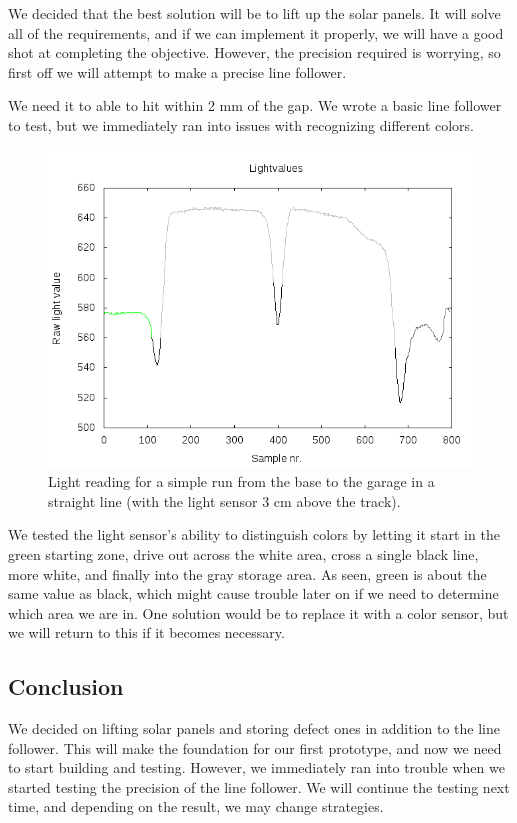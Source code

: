 We decided that the best solution will be to lift up the solar panels.
It will solve all of the requirements, and if we can implement it
properly, we will have a good shot at completing the objective. However,
the precision required is worrying, so first off we will attempt to
make a precise line follower.

We need it to able to hit within 2 mm of
the gap. We wrote a basic line follower to test, but we immediately ran
into issues with recognizing different colors.

\begin{figure}[h]
  \centering
  \includegraphics[scale=0.43]{../experiments/1prototype/results/gnuplot/GridAccuracy3cm_color.png}
  \caption{Light reading for a simple run from the base to the garage in a straight line (with the light sensor 3 cm above the track).}
\end{figure}


We tested the light sensor's ability to distinguish colors by letting it
start in the green starting zone, drive out across the white area,
cross a single black line, more white, and finally into the gray
storage area. As seen, green is about the same value as black, which
might cause trouble later on if we need to determine which area we are
in. One solution would be to replace it with a color sensor, but we will
return to this if it becomes necessary.

\subsection{Conclusion}

We decided on lifting solar panels and storing defect ones in addition
to the line follower. This will make the foundation for our first
prototype, and now we need to start building and testing. However, we
immediately ran into trouble when we started testing the precision of
the line follower. We will continue the testing next time, and depending
on the result, we may change strategies.
